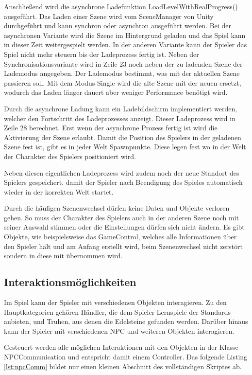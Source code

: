 			Anschließend wird die asynchrone Ladefunktion LoadLevelWithRealProgress() ausgeführt. Das Laden einer Szene wird vom SceneManager von Unity durchgeführt und kann synchron oder asynchron ausgeführt werden. Bei der asynchronen Variante wird die Szene im Hintergrund geladen und das Spiel kann in dieser Zeit weitergespielt werden. In der anderen Variante kann der Spieler das Spiel nicht mehr steuern bis der Ladeprozess fertig ist. Neben der Synchronisationsvariante wird in Zeile 23 noch neben der zu ladenden Szene der Lademodus angegeben. Der Lademodus bestimmt, was mit der aktuellen Szene passieren soll. Mit dem Modus Single wird die alte Szene mit der neuen ersetzt, wodurch das Laden länger dauert aber weniger Performance benötigt wird.	
	
			Durch die asynchrone Ladung kann ein Ladebildschirm implementiert werden, welcher den Fortschritt des Ladeprozesses anzeigt. Dieser Ladeprozess wird in Zeile 28 berechnet. Erst wenn der asynchrone Prozess fertig ist wird die Aktivierung der Szene erlaubt. Damit die Position des Spielers in der geladenen Szene fest ist, gibt es in jeder Welt Spawnpunkte. Diese legen fest wo in der Welt der Charakter des Spielers positioniert wird.
	
			Neben diesen eigentlichen Ladeprozess wird zudem noch der neue Standort des Spielers gespeichert, damit der Spieler nach Beendigung des Spieles automatisch wieder in der korrekten Welt startet. 
	
			Durch die häufigen Szenenwechsel dürfen keine Daten und Objekte verloren gehen. So muss der Charakter des Spielers auch in der anderen Szene noch mit seiner Auswahl stimmen oder die Einstellungen dürfen sich nicht ändern. Es gibt Objekte, wie beispielsweise das  GameControl, welches alle Informationen über den Spieler hält und am Anfang erstellt wird, beim Szenenwechsel nicht zerstört sondern in diese mit übernommen wird.

		\subsection{Interaktionsmöglichkeiten}
			Im Spiel kann der Spieler mit verschiedenen Objekten interagieren. Zu den Hauptkategorien gehören Händler, die dem Spieler Lernspiele der Standards anbieten, und Truhen, aus denen die Edelsteine gefunden werden. Darüber hinaus kann der Spieler mit verschiedenen \ac{NPC} und weiteren Objekten interagieren.
	
			Gesteuert werden alle möglichen Interaktionen mit den Objekten in der Klasse NPCCommunication und entspricht damit einem Controller. Das folgende Listing \ref{lst:npcComm} bildet nur einen kleinen Abschnitt des vollständigen Skriptes ab.
	
